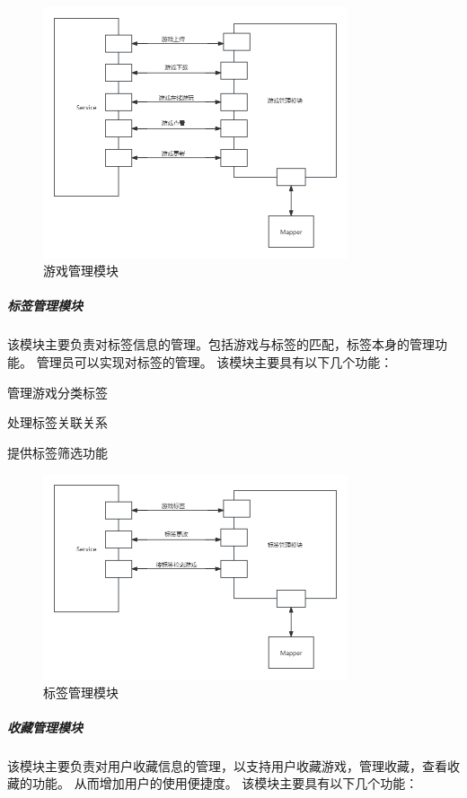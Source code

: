 \documentclass[12pt]{ctexart} %
\begin{document}
\begin{figure}[htbp]
  \centering 
  \includegraphics[width=0.8\textwidth]{game.png}
  \caption{游戏管理模块}
\end{figure}

\subparagraph{标签管理模块}

该模块主要负责对标签信息的管理。包括游戏与标签的匹配，标签本身的管理功能。
管理员可以实现对标签的管理。
该模块主要具有以下几个功能：

管理游戏分类标签

处理标签关联关系

提供标签筛选功能

\begin{figure}[H]
  \centering 
  \includegraphics[width=0.8\textwidth]{tag.png}
  \caption{标签管理模块}
\end{figure}

\subparagraph{收藏管理模块}

该模块主要负责对用户收藏信息的管理，以支持用户收藏游戏，管理收藏，查看收藏的功能。
从而增加用户的使用便捷度。
该模块主要具有以下几个功能：
\end{document}
